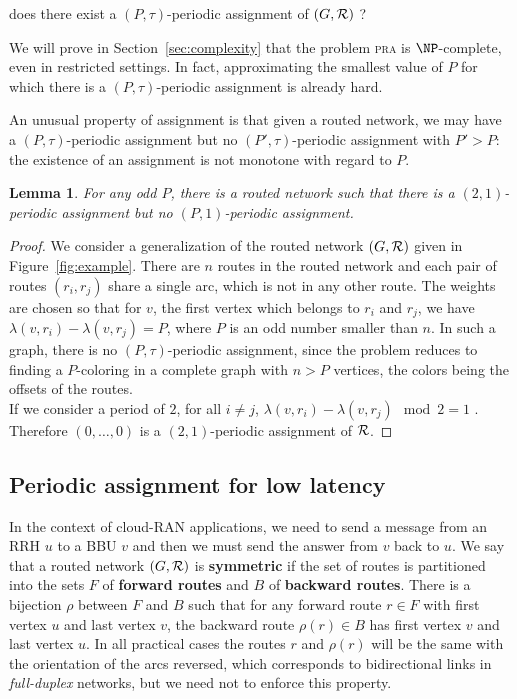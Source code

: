 \documentclass[10pt, conference, letterpaper]{IEEEtran}
\newtheorem{lemma}[theorem]{Lemma}
\newcommand\pra{\textsc{pra}\xspace}
\begin{document}
       does there exist a $(P,\tau)$-periodic assignment of $(G,\cal R)$ ?


      We will prove in Section~\ref{sec:complexity} that the problem \pra is $\NP$-complete, even in restricted settings.
      In fact, approximating the smallest value of $P$ for which there is a $(P,\tau)$-periodic assignment is already hard.
      
      An unusual property of assignment is that given a routed network, we may have a $(P,\tau)$-periodic assignment but no
      $(P',\tau)$-periodic assignment with $P' > P$: the existence of an assignment is not monotone with regard to $P$.

	\begin{lemma} \label{lemma:monotonic}
	 For any odd $P$, there is a routed network such that there is a $(2,1)$-periodic assignment but no $(P,1)$-periodic assignment.
	\end{lemma}
\begin{proof}

      We consider a generalization of the routed network $(G,{\cal R})$ given in Figure~\ref{fig:example}. 
      There are $n$ routes in the routed network and each pair of routes $(r_i,r_j)$ share a single arc, which is not in any other route. The weights are chosen so that for $v$, the first vertex which belongs to $r_i$ and $r_j$, we have $\lambda(v,r_i) - \lambda(v,r_j)= P$, where $P$ is an odd number smaller than $n$. In such a graph, there is no $(P,\tau)$-periodic assignment, since the problem reduces to finding a $P$-coloring in a complete graph with $n > P$ vertices, the colors being the offsets of the routes.\\
      If we consider a period of $2$, for all $i \neq j$, $\lambda(v,r_i) - \lambda(v,r_j) \mod 2 = 1$ . Therefore $(0,\dots,0)$ is a $(2,1)$-periodic assignment of ${\cal R}$.      
\end{proof}
      
      
      \subsection{Periodic assignment for low latency}
      
   In the context of cloud-RAN applications, we need to send a message from an RRH $u$ to a BBU $v$ and then 
      we must send the answer from $v$ back to $u$. We say that a routed network $(G, {\cal R})$ is \textbf{symmetric} if the set of routes is partitioned into the sets $F$ of \textbf{forward routes} and $B$ of \textbf{backward routes}. There is a bijection $\rho$ between $F$ and $B$ such that for any forward route $r \in F$ with first vertex $u$ and last vertex $v$, the backward route $\rho(r) \in B$ has first vertex $v$ and last vertex $u$. In all practical cases the routes $r$ and $\rho(r)$ will be the same with the orientation of the arcs reversed, which corresponds to bidirectional links in \emph{full-duplex} networks, but we need not to enforce this property.
         
\end{document}
